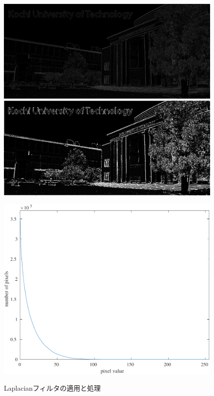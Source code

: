 \begin{figure}[H]
    \centering
    \begin{minipage}[b]{.3\textwidth}
        \centering
        \includegraphics[keepaspectratio,width=\textwidth]{../../Figures/06_41_lf-img}
    \end{minipage}
    \begin{minipage}[b]{.3\textwidth}
        \centering
        \includegraphics[keepaspectratio,width=\textwidth]{../../Figures/06_43_lf-img-thresholding.png}
    \end{minipage}
    \begin{minipage}[b]{.3\textwidth}
        \centering
        \includegraphics[keepaspectratio,width=\textwidth]{../../Figures/06_42_Thresholding-graph.pdf}
        \label{fig:Laplacianフィルタのヒストグラム}
    \end{minipage}
    \caption{Laplacianフィルタの適用と処理}
\end{figure}
